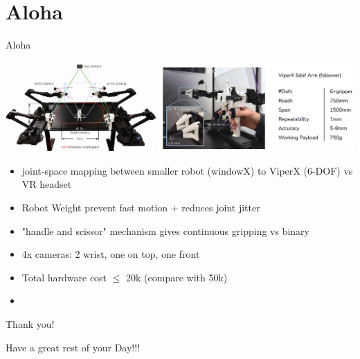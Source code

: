\documentclass{beamer}
\begin{document}
\section{Aloha}
\begin{frame}[t]{Aloha}
    \begin{center}
        \includegraphics[width=1.0\textwidth]{./img/aloha_hw.png}
    \end{center}
    \begin{itemize}[label=-]
        \item joint-space mapping between smaller robot (windowX) to ViperX (6-DOF) vs VR headset
        \item Robot Weight prevent fast motion + reduces joint jitter 
        \item "handle and scissor" mechanism gives continuous gripping vs binary
        \item 4x cameras: 2 wrist, one on top, one front
        \item Total hardware cost $\leq$ 20k (compare with 50k)
        \item 
    
    \end{itemize}
\end{frame}

\begin{frame}{Thank you!}
	\begin{center}
        Have a great rest of your Day!!!
	\end{center}
	\begin{center}
	\end{center}
\end{frame}
\end{document}
